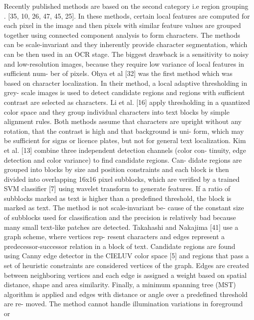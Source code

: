 Recently published methods are based on the second category i.e region grouping \cite{chap2-7, chap2-8, }.
[35, 10, 26, 47, 45, 25]. 
In these methods, certain local features are computed for each pixel in the image and
then pixels with similar feature values are grouped together using connected
component analysis to form characters. The methods can be scale-invariant and
they inherently provide character segmentation, which can be then used in an
OCR stage. The biggest drawback is a sensitivity to noisy and low-resolution
images, because they require low variance of local features in sufficient num-
ber of pixels.
Ohya et al [32] \cite{chap2-6} was the first method which was based on character localization. 
In their method, a local adaptive thresholding in grey-
scale images is used to detect candidate regions and regions with sufficient
contrast are selected as characters. Li et al. [16] apply thresholding in a
quantized color space and they group individual characters into text blocks
by simple alignment rules. Both methods assume that characters are upright
without any rotation, that the contrast is high and that background is uni-
form, which may be sufficient for signs or licence plates, but not for general
text localization.
Kim et al. [13] combine three independent detection channels (color con-
tinuity, edge detection and color variance) to find candidate regions. Can-
didate regions are grouped into blocks by size and position constraints and
each block is then divided into overlapping 16x16 pixel subblocks, which are
verified by a trained SVM classifier [7] using wavelet transform to generate
features. If a ratio of subblocks marked as text is higher than a predefined
threshold, the block is marked as text. The method is not scale-invariant be-
cause of the constant size of subblocks used for classification and the precision
is relatively bad because many small text-like patches are detected.
Takahashi and Nakajima [41] use a graph scheme, where vertices rep-
resent characters and edges represent a predecessor-successor relation in a
block of text. Candidate regions are found using Canny edge detector in the
CIELUV color space [5] and regions that pass a set of heuristic constraints
are considered vertices of the graph. Edges are created between neighboring
vertices and each edge is assigned a weight based on spatial distance, shape
and area similarity. Finally, a minimum spanning tree (MST) algorithm is
applied and edges with distance or angle over a predefined threshold are re-
moved. The method cannot handle illumination variations in foreground or
